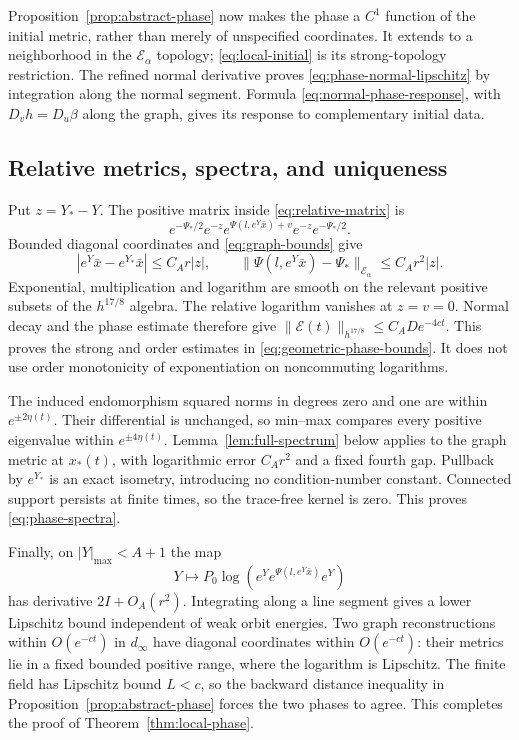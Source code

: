 \documentclass[11pt]{amsart}
\theoremstyle{definition}
\theoremstyle{remark}
\begin{document}
Proposition~\ref{prop:abstract-phase} now makes the phase a
$C^1$ function of the initial metric, rather than merely of
unspecified coordinates. It extends to a neighborhood in the
$\mathcal E_\alpha$ topology; \eqref{eq:local-initial} is its
strong-topology restriction. The refined normal derivative proves
\eqref{eq:phase-normal-lipschitz} by integration along the normal
segment. Formula \eqref{eq:normal-phase-response}, with
$D_vh=D_u\beta$ along the graph, gives its response to
complementary initial data.

\subsection{Relative metrics, spectra, and uniqueness}
Put $z=Y_*-Y$. The positive matrix inside
\eqref{eq:relative-matrix} is
\[
 e^{-\Psi_*/2}e^{-z}
       e^{\Psi(l,e^Y\bar x)+v}
       e^{-z}e^{-\Psi_*/2}.
\]
Bounded diagonal coordinates and \eqref{eq:graph-bounds} give
\[
 |e^Y\bar x-e^{Y_*}\bar x|\le C_Ar|z|,\qquad
 \|\Psi(l,e^Y\bar x)-\Psi_*\|_{\mathcal E_\alpha}
       \le C_Ar^2|z|.
\]
Exponential, multiplication and logarithm are smooth on the
relevant positive subsets of the $h^{17/8}$ algebra. The relative
logarithm vanishes at $z=v=0$. Normal decay and the phase estimate
therefore give $\|\mathcal E(t)\|_{h^{17/8}}\le C_AD e^{-4ct}$.
This proves the strong and order estimates in
\eqref{eq:geometric-phase-bounds}. It does not use order
monotonicity of exponentiation on noncommuting logarithms.

The induced endomorphism squared norms in degrees zero and one
are within $e^{\pm2\eta(t)}$. Their differential is unchanged,
so min--max compares every positive eigenvalue within
$e^{\pm4\eta(t)}$. Lemma~\ref{lem:full-spectrum} below applies
to the graph metric at $x_*(t)$, with logarithmic error $C_Ar^2$
and a fixed fourth gap. Pullback by $e^{Y_*}$ is an exact
isometry, introducing no condition-number constant.
Connected support persists at finite times, so the trace-free
kernel is zero. This proves \eqref{eq:phase-spectra}.

Finally, on $|Y|_{\max}<A+1$ the map
\[
 Y\longmapsto
 P_0\log\!\left(e^Ye^{\Psi(l,e^Y\bar x)}e^Y\right)
\]
has derivative $2I+O_A(r^2)$. Integrating along a line segment
gives a lower Lipschitz bound independent of weak orbit energies.
Two graph reconstructions within $O(e^{-ct})$ in $d_\infty$
have diagonal coordinates within $O(e^{-ct})$: their metrics
lie in a fixed bounded positive range, where the logarithm is
Lipschitz. The finite field has Lipschitz bound $L<c$, so the
backward distance inequality in Proposition~\ref{prop:abstract-phase}
forces the two phases to agree. This completes the proof of
Theorem~\ref{thm:local-phase}.
\end{document}
